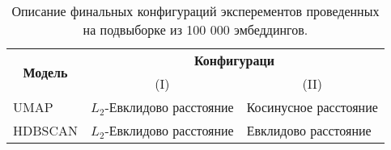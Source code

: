 \begin{longtable}[c]{|l|ll|}
    \caption{Описание финальных конфигураций эксперементов проведенных на подвыборке из 100 000 эмбеддингов.}
    \label{tab:experiment_configs}\\
    \hline
    \multicolumn{1}{|c|}{\multirow{2}{*}{\textbf{Модель}}} & \multicolumn{2}{c|}{\textbf{Конфигураци}}                         \\ \cline{2-3}
    \multicolumn{1}{|c|}{}                                 & \multicolumn{1}{c|}{(I)}               & \multicolumn{1}{c|}{(II)}  \\ \hline
    \endfirsthead

    \endhead

    UMAP    & \multicolumn{1}{l|}{$L_2$-Евклидово расстояние} & \multicolumn{1}{l|}{Косинусное расстояние}    \\
    HDBSCAN & \multicolumn{1}{l|}{$L_2$-Евклидово расстояние} & \multicolumn{1}{l|}{Евклидово расстояние} \\ \hline
\end{longtable}